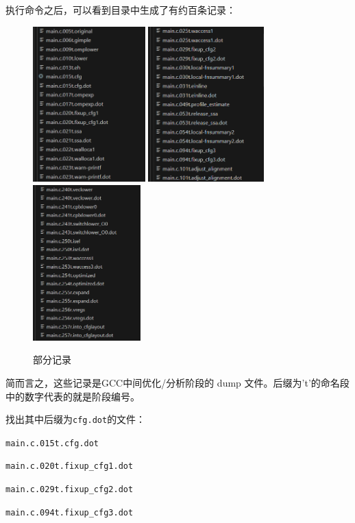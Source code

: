 \documentclass[UTF8,a4paper,10pt]{ctexart}
\begin{document}
执行命令之后，可以看到目录中生成了有约百条记录：
\begin{figure}[htbp]
  \centering
  \includegraphics[height=6cm]{ccl_2.png}
  \includegraphics[height=6cm]{ccl_3.png}
  \includegraphics[height=6cm]{ccl_4.png}
  \caption{部分记录}
\end{figure}

简而言之，这些记录是GCC中间优化/分析阶段的 dump 文件。后缀为't'的命名段中的数字代表的就是阶段编号。

找出其中后缀为\texttt{cfg.dot}的文件：

\begin{center}
    
\texttt{\large{main.c.015t.cfg.dot}}

\texttt{\large{main.c.020t.fixup\_cfg1.dot}}

\texttt{\large{main.c.029t.fixup\_cfg2.dot}}

\texttt{\large{main.c.094t.fixup\_cfg3.dot}}

\end{center}
\end{document}
